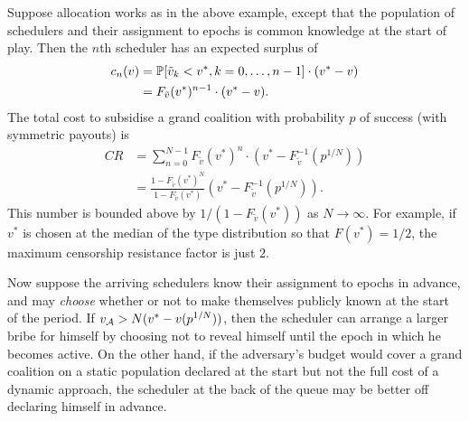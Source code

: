 \begin{example}

  Suppose allocation works as in the above example, except that the population of schedulers and their assignment to epochs is common knowledge at the start of play.
  Then the $n$th scheduler has an expected surplus of
  \begin{align*}
    c_n(v) &= \mathbb{P}[\tilde{v}_k < v^*, k=0,\ldots,n-1] \cdot (v^* - v) \\
    &= F_{\tilde{v}}(v^*)^{n-1}\cdot (v^* - v).
  \end{align*}
  The total cost to subsidise a grand coalition with probability $p$ of success (with symmetric payouts) is
  \begin{align*}
    CR &= \sum_{n=0}^{N-1} F_{\tilde{v}}(v^*)^{n}\cdot (v^* - F_{\tilde{v}}^{-1}(p^{1/N})) \\
    &= \frac{1- F_{\tilde{v}}(v^*)^N}{1-F_{\tilde{v}}(v^*)} (v^* - F_{\tilde{v}}^{-1}(p^{1/N})).
  \end{align*}
  This number is bounded above by $1/(1-F_{\tilde{v}}(v^*))$ as $N\rightarrow\infty$.
  For example, if $v^*$ is chosen at the median of the type distribution so that $F(v^*)=1/2$, the maximum censorship resistance factor is just $2$.

  Now suppose the arriving schedulers know their assignment to epochs in advance, and may \emph{choose} whether or not to make themselves publicly known at the start of the period.
  If $v_{\mathcal{A}} > N(v^* - v(p^{1/N}))$, then the scheduler can arrange a larger bribe for himself by choosing not to reveal himself until the epoch in which he becomes active.
  On the other hand, if the adversary's budget would cover a grand coalition on a static population declared at the start but not the full cost of a dynamic approach, the scheduler at the back of the queue may be better off declaring himself in advance.

\end{example}

